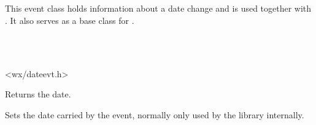 
\section{}\label{wxdateevent}

This event class holds information about a date change and is used together
with . It also serves as a base class
for .


\\
\\


<wx/dateevt.h>


\label{wxdateeventgetdate}


Returns the date.


\label{wxdateeventsetdate}


Sets the date carried by the event, normally only used by the library
internally.


